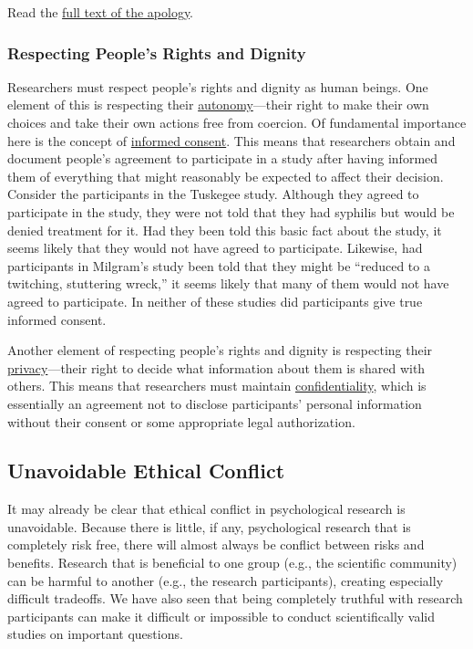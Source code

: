 \documentclass[
]{krantz}
\begin{document}
Read the \href{https://clintonwhitehouse4.archives.gov/textonly/New/Remarks/Fri/19970516-898.html}{full text of the apology}.

\subsubsection*{Respecting People's Rights and Dignity}\label{respecting-peoples-rights-and-dignity}


Researchers must respect people's rights and dignity as human beings. One element of this is respecting their \hyperref[autonomy]{autonomy}---their right to make their own choices and take their own actions free from coercion. Of fundamental importance here is the concept of \hyperref[informed-consent]{informed consent}. This means that researchers obtain and document people's agreement to participate in a study after having informed them of everything that might reasonably be expected to affect their decision. Consider the participants in the Tuskegee study. Although they agreed to participate in the study, they were not told that they had syphilis but would be denied treatment for it. Had they been told this basic fact about the study, it seems likely that they would not have agreed to participate. Likewise, had participants in Milgram's study been told that they might be ``reduced to a twitching, stuttering wreck,'' it seems likely that many of them would not have agreed to participate. In neither of these studies did participants give true informed consent.

Another element of respecting people's rights and dignity is respecting their \hyperref[privacy]{privacy}---their right to decide what information about them is shared with others. This means that researchers must maintain \hyperref[confidentiality]{confidentiality}, which is essentially an agreement not to disclose participants' personal information without their consent or some appropriate legal authorization.

\subsection*{Unavoidable Ethical Conflict}\label{unavoidable-ethical-conflict}


It may already be clear that ethical conflict in psychological research is unavoidable. Because there is little, if any, psychological research that is completely risk free, there will almost always be conflict between risks and benefits. Research that is beneficial to one group (e.g., the scientific community) can be harmful to another (e.g., the research participants), creating especially difficult tradeoffs. We have also seen that being completely truthful with research participants can make it difficult or impossible to conduct scientifically valid studies on important questions.
\end{document}
